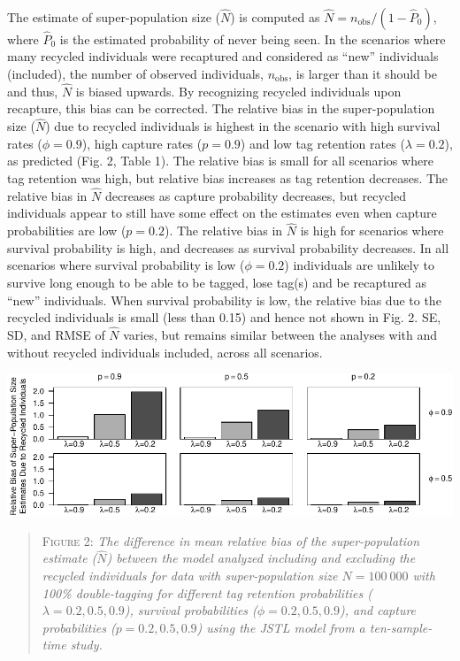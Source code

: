 \documentclass[12pt]{article}
\begin{document}
~ ~

The estimate of super-population size (\(\hat{N}\)) is computed as
\(\hat{N}=n_{\text{obs}}/{(1-\hat{P}_0)}\), where \(\hat{P}_0\) is the
estimated probability of never being seen. In the scenarios where many
recycled individuals were recaptured and considered as ``new''
individuals (included), the number of observed individuals, \(n_{\text{obs}}\), is larger than it should  be and thus,
\(\hat{N}\) is biased upwards. By recognizing recycled individuals upon recapture, this bias can be corrected. The relative bias in the
super-population size (\(\hat{N}\)) due to recycled individuals is 
highest in the scenario with high survival rates (\(\phi=0.9\)), high
capture rates (\(p=0.9\)) and low tag retention rates (\(\lambda=0.2\)),
as predicted (Fig. 2, Table 1). The relative bias is small for all
scenarios where tag retention was high, but relative bias increases as
tag retention decreases. The relative bias in \(\hat{N}\) decreases as
capture probability decreases, but recycled individuals appear to still
have some effect on the estimates even when capture probabilities
are low (\(p=0.2\)). The relative bias in \(\hat{N}\) is high for
scenarios where survival probability is high, and decreases as
survival probability decreases. In all scenarios where survival probability is
low (\(\phi=0.2\)) individuals are unlikely to survive long enough to be
able to be tagged, lose tag(s) and be recaptured as  ``new''
individuals. When survival probability is low, the relative bias due to the recycled
individuals is small (less than 0.15) and hence not shown in Fig. 2.
SE, SD, and RMSE of \(\hat{N}\) varies, but remains similar between the
analyses with and without recycled individuals included, across all
scenarios.

\includegraphics{RecycledPaper_files/figure-latex/Figure2_N-1.pdf}

\begin{quote}
\textsc{Figure 2:}
\textsl{The difference in mean relative bias of the super-population estimate ($\hat{N}$) between the model analyzed including and excluding the recycled individuals for data with super-population size $N=100\ 000$ with 100\% double-tagging for different tag retention probabilities ($\lambda=0.2,0.5,0.9$), survival probabilities ($\phi=0.2,0.5,0.9$), and capture probabilities ($p=0.2,0.5,0.9$) using the JSTL model from a ten-sample-time study.}
\end{quote}
\end{document}
